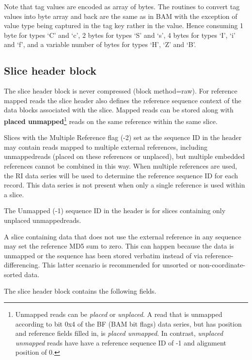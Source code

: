 \documentclass[a4paper]{article}
\begin{document}
Note that tag values are encoded as array of bytes. The routines to convert tag 
values into byte array and back are the same as in BAM with the exception of value 
type being captured in the tag key rather in the value.
Hence consuming 1 byte for types `C' and `c', 2 bytes for types `S' and `s', 4 bytes for types `I', `i' and `f', and a variable number of bytes for types `H', `Z' and `B'.

\subsection{\textbf{Slice header block}}

The slice header block is never compressed (block method=raw). For reference mapped 
reads the slice header also defines the reference sequence context of the data 
blocks associated with the slice. Mapped reads can be stored along with
\textbf{placed unmapped}\footnote{Unmapped reads can be \textit{placed} or \textit{unplaced}.
A read that is unmapped according to bit 0x4 of the BF (BAM bit flags)
data series, but has position and reference fields filled in, is
\textit{placed unmapped}.  In contrast, \textit{unplaced unmapped}
reads have have a reference sequence ID of -1 and alignment position of 0.}
reads on the same reference within the same slice.

Slices with the Multiple Reference flag (-2) set as the sequence ID in the header may contain reads
mapped to multiple external references, including unmapped\footnotemark[\value{footnote}] reads (placed on these references or unplaced),
but multiple embedded references cannot be combined in this way.  When multiple references are
used, the RI data series will be used to determine the reference sequence ID for each record.  This
data series is not present when only a single reference is used within a slice.

The Unmapped (-1) sequence ID in the header is for slices containing only unplaced
unmapped\footnotemark[\value{footnote}] reads.

A slice containing data that does not use the external reference in
any sequence may set the reference MD5 sum to zero.  This can happen
because the data is unmapped or the sequence has been stored verbatim
instead of via reference-differencing.  This latter scenario is
recommended for unsorted or non-coordinate-sorted data.

The slice header block contains the following fields.
\end{document}
